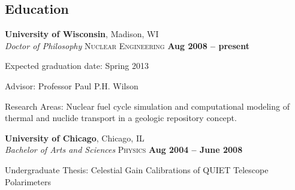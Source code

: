 \documentclass[margin,line]{resume}
\begin{document}
\begin{resume}
    \section{\mysidestyle Education}

    \textbf{University of Wisconsin}, Madison, WI \vspace{1mm}\\\vspace{1mm}%
    \textsl{Doctor of Philosophy} \textsc{Nuclear Engineering}\hfill \textbf{ Aug 2008 -- present}\vspace{-3mm}\\\vspace{-1mm}%
    \begin{list2}
        \item Expected graduation date: Spring 2013
        \item Advisor:  Professor Paul P.H. Wilson                
				\item Research Areas: Nuclear fuel cycle simulation and computational modeling 
			        of thermal and nuclide transport in a geologic repository concept. 
		\end{list2}\vspace{-1.5mm}
		\textbf{University of Chicago}, Chicago, IL \vspace{1mm}\\\vspace{1mm}%
		\textsl{Bachelor of Arts and Sciences}\textsc{ Physics} \hfill \textbf{Aug 2004 -- June 2008}\vspace{-3mm}\\\vspace{-1mm}%
		\begin{list2}
				\item Undergraduate Thesis: Celestial Gain Calibrations of QUIET Telescope Polarimeters
		\end{list2}\vspace{-1.5mm}


\end{resume}
\end{document}
